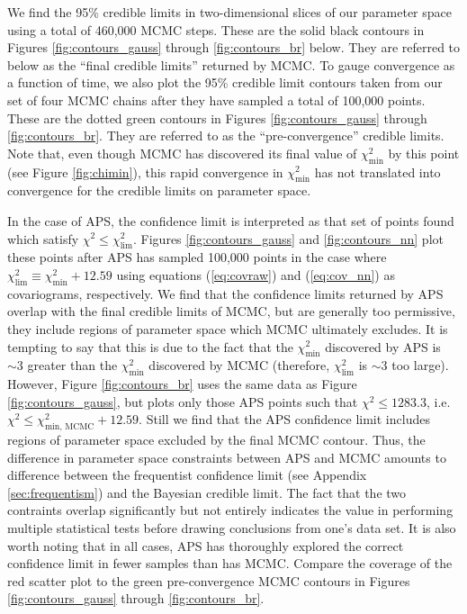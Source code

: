 \documentclass[useAMS,usenatbib]{aastex}
\begin{document}
We find the 95\% credible
limits in two-dimensional slices of our parameter space using
a total of 460,000 MCMC steps.  These are the solid
black contours in Figures \ref{fig:contours_gauss} through 
\ref{fig:contours_br} 
below.  They are referred to below as the ``final credible limits''
returned by MCMC.  To gauge
convergence as a function of time, we also plot the 95\% credible limit contours
taken from our set of four MCMC chains after they have sampled
a total of 100,000 points.  
These are the dotted green
contours in Figures \ref{fig:contours_gauss} through \ref{fig:contours_br}.
They are referred to as the ``pre-convergence'' credible limits.
Note that, even though MCMC has discovered its final value of $\chi^2_\text{min}$
by this point (see Figure \ref{fig:chimin}), this rapid convergence in
$\chi^2_\text{min}$ has not translated into convergence for the credible limits
on parameter space.

In the case of APS, the confidence limit is interpreted 
as that set of points found
which satisfy $\chi^2\le\chi^2_\text{lim}$.  Figures \ref{fig:contours_gauss}
and \ref{fig:contours_nn} plot these points after APS has sampled 100,000 
points in the case where $\chi^2_\text{lim}\equiv\chi^2_\text{min}+12.59$
using equations (\ref{eq:covraw}) and (\ref{eq:cov_nn}) as covariograms,
respectively.
We find that the confidence limits returned by APS overlap with
the final credible limits of MCMC, but are generally too permissive,
they include regions of parameter space which MCMC ultimately excludes.
It is tempting to say that
this is due to the fact that the $\chi^2_\text{min}$ discovered by
APS is $\sim3$ greater than the $\chi^2_\text{min}$ discovered by
MCMC (therefore, $\chi^2_\text{lim}$ is $\sim 3$ too large).
However, Figure \ref{fig:contours_br} uses the same data as
Figure \ref{fig:contours_gauss}, but plots only those APS points
such that $\chi^2\le 1283.3$, i.e. $\chi^2\le\chi^2_\text{min, MCMC}+12.59$.
Still we find that the APS confidence limit includes regions of parameter
space excluded by the final MCMC contour.  Thus, the difference in
parameter space constraints between APS and MCMC amounts to difference
between the frequentist confidence limit (see Appendix \ref{sec:frequentism})
and the Bayesian credible limit.  The fact that the two contraints overlap
significantly but not entirely indicates the value in performing multiple
statistical tests before drawing conclusions from one's data set.
It is also worth noting that in all cases, APS has thoroughly explored
the correct confidence limit in fewer samples than has MCMC.  Compare the
coverage of the red scatter plot to the green pre-convergence MCMC contours in
Figures \ref{fig:contours_gauss} through \ref{fig:contours_br}.
\end{document}
